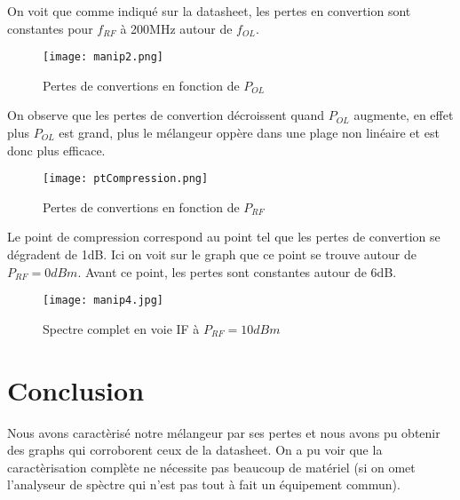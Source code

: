 \documentclass[oneside,a4paper,12pt]{article}
\begin{document}
	On voit que comme indiqué sur la datasheet, les pertes en convertion sont constantes pour $f_{RF}$ à 200MHz autour de $f_{OL}$.
	
	\begin{figure}[h]
		\centering
		\texttt{[image: manip2.png]}	
		\caption{Pertes de convertions en fonction de $P_{OL}$}
	\end{figure}

	On observe que les pertes de convertion décroissent quand $P_{OL}$ augmente, en effet plus $P_{OL}$ est grand,
	plus le mélangeur oppère dans une plage non linéaire et est donc plus efficace.

	\begin{figure}[h]
		\centering
		\texttt{[image: ptCompression.png]}	
		\caption{Pertes de convertions en fonction de $P_{RF}$}
	\end{figure}

	Le point de compression correspond au point tel que les pertes de convertion se dégradent de 1dB. 
	Ici on voit sur le graph que ce point se trouve autour de $P_{RF}=0dBm$. Avant ce point, les pertes sont constantes autour de 6dB.

	\begin{figure}[h]
		\centering
		\texttt{[image: manip4.jpg]}	
		\caption{Spectre complet en voie IF à $P_{RF} = 10dBm$}
	\end{figure}

	\newpage
	\section{Conclusion}

	Nous avons caractèrisé notre mélangeur par ses pertes et nous avons pu obtenir des graphs qui corroborent ceux de la datasheet.
	On a pu voir que la caractèrisation complète ne nécessite pas beaucoup de matériel (si on omet l'analyseur de spèctre qui n'est pas tout à fait un équipement commun).
	
\end{document}
